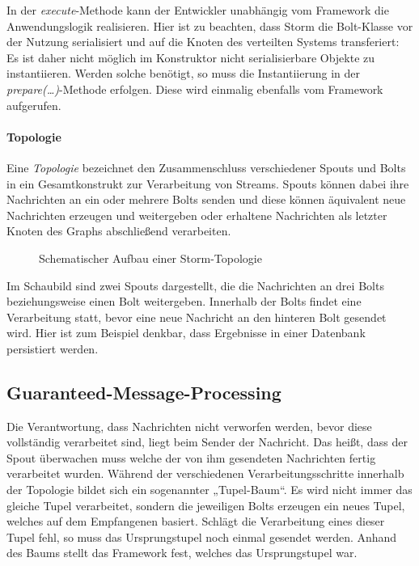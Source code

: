 \documentclass[a4paper,11pt]{scrartcl}
\begin{document}
  In der \textit{execute}-Methode kann der Entwickler unabhängig vom
  Framework die Anwendungslogik realisieren. Hier ist zu beachten,
  dass Storm die Bolt-Klasse vor der Nutzung serialisiert und auf die
  Knoten des verteilten Systems transferiert: Es ist daher nicht
  möglich im Konstruktor nicht serialisierbare Objekte zu instantiieren.
  Werden solche benötigt, so muss die Instantiierung in der
  \textit{prepare(\ldots)}-Methode erfolgen. Diese wird einmalig ebenfalls vom
  Framework aufgerufen.

  \paragraph{Topologie}
  Eine \textit{Topologie} bezeichnet den Zusammenschluss verschiedener
  Spouts und Bolts in ein Gesamtkonstrukt zur Verarbeitung von Streams. Spouts
  können dabei ihre Nachrichten an ein oder mehrere Bolts senden und diese
  können äquivalent neue Nachrichten erzeugen und weitergeben oder erhaltene
  Nachrichten als letzter Knoten des Graphs abschließend verarbeiten.

  \begin{figure}[!h]
    \center
    \scalebox{.7}{}
    \caption{Schematischer Aufbau einer Storm-Topologie}
    \label{fig:topology}
  \end{figure}

  Im Schaubild sind zwei Spouts dargestellt, die die Nachrichten an
  drei Bolts beziehungsweise einen Bolt weitergeben. Innerhalb der Bolts
  findet eine Verarbeitung statt, bevor eine neue Nachricht an den
  hinteren Bolt gesendet wird. Hier ist zum Beispiel denkbar, dass
  Ergebnisse in einer Datenbank persistiert werden.

  \subsection{Guaranteed-Message-Processing}
  Die Verantwortung, dass Nachrichten nicht verworfen werden, bevor
  diese vollständig verarbeitet sind, liegt beim Sender der Nachricht.
  Das heißt, dass der Spout überwachen muss welche der von ihm
  gesendeten Nachrichten fertig verarbeitet wurden. Während der
  verschiedenen Verarbeitungsschritte innerhalb der Topologie bildet
  sich ein sogenannter „Tupel-Baum“. Es wird nicht immer das gleiche
  Tupel verarbeitet, sondern die jeweiligen Bolts erzeugen ein neues
  Tupel, welches auf dem Empfangenen basiert. Schlägt die Verarbeitung
  eines dieser Tupel fehl, so muss das Ursprungstupel noch einmal
  gesendet werden.\cite{stormguaranteedprocessing} Anhand des Baums stellt das
  Framework fest, welches das Ursprungstupel war.
\end{document}
